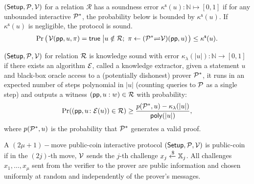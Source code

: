\begin{definition}
	\label{def:soundness}
	$({\sf Setup}, \mathcal{P}, \mathcal{V})$ for a relation $\mathcal{R}$ has a soundness error $\kappa^\mathsf{s}(u)\colon \mathbb{N} \mapsto [0, 1]$ if for any unbounded interactive $\mathcal{P}^*$, the probability 
	below
	is bounded by $\kappa^\mathsf{s}(u)$.
	If $\kappa^\mathsf{s}(u)$ is negligible,
	the protocol is sound.
	\begin{equation*}
	\Pr
		\left(
			\left.
			\begin{aligned}
				& \mathcal{V}({\sf pp}, u, \pi) = {\sf true} \\
			\end{aligned}
			\right.
			\left|
			\begin{aligned}
				& u \notin \mathcal{R};~ \pi \leftarrow (\mathcal{P}^* {\rightleftharpoons} \mathcal{V}) ({\sf pp}, u) \\
			\end{aligned}
			\right.
		\right)
	\le \kappa^\mathsf{s}(u).
	\end{equation*}
\end{definition}

\begin{definition}
	\label{def: soundnessExtract}
	$({\sf Setup}, \mathcal{P}, \mathcal{V})$ for relation $\mathcal{R}$ is knowledge sound with error $\kappa_{\lambda}(|u|) \colon \mathbb{N} \rightarrow [0, 1]$ if there exists an algorithm $\mathcal{E}$, called a knowledge extractor, given a statement $u$ and black-box oracle access to a (potentially dishonest) prover $\mathcal{P}^*$, 
		it runs in an expected number of steps polynomial in $|u|$ (counting queries to $\mathcal{P}$ as a single step) and outputs a witness $ ({\sf pp}, u: w) \in \mathcal{R}$ with probability: 
		\[
		\Pr(({\sf pp}, u \colon \mathcal{E}(u) ) \in \mathcal{R}) 
		\ge
		\frac
		{p(\mathcal{P}^*, u) - \kappa_{\lambda}(|u|)}
		{{\sf poly}(|u|)},
		\]
	where $p(\mathcal{P}^*, u)$ is the probability that $\mathcal{P}^*$ generates 
	a valid proof.
\end{definition}



\begin{definition}
	\label{def: publicCoin}
	A $(2 \mu + 1)-$move public-coin interactive protocol $({\sf Setup}, \mathcal{P}, \mathcal{V})$ is public-coin if in the $(2j)$-th move, $\mathcal{V}$ sends the $j$-th challenge $x_j \mathrel{\xleftarrow{\$}} \mathbb{X}_j$.
	All challenges $x_1, \ldots, x_{\mu}$ sent from the verifier to the prover are public information and chosen uniformly at random and independently of the prover's messages.
\end{definition}

